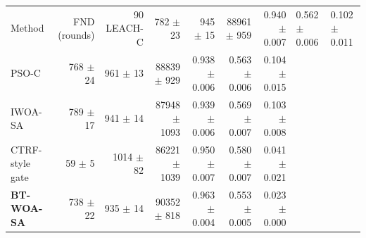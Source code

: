 \begin{tabular}{lrrrrrr}
\toprule
Method & FND (rounds) & 90 %
\midrule
LEACH-C & 782 $\pm$ 23 & 945 $\pm$ 15 & 88961 $\pm$ 959 & 0.940 $\pm$ 0.007 & 0.562 $\pm$ 0.006 & 0.102 $\pm$ 0.011 \\
PSO-C & 768 $\pm$ 24 & 961 $\pm$ 13 & 88839 $\pm$ 929 & 0.938 $\pm$ 0.006 & 0.563 $\pm$ 0.006 & 0.104 $\pm$ 0.015 \\
IWOA-SA & 789 $\pm$ 17 & 941 $\pm$ 14 & 87948 $\pm$ 1093 & 0.939 $\pm$ 0.006 & 0.569 $\pm$ 0.007 & 0.103 $\pm$ 0.008 \\
CTRF-style gate & 59 $\pm$ 5 & 1014 $\pm$ 82 & 86221 $\pm$ 1039 & 0.950 $\pm$ 0.007 & 0.580 $\pm$ 0.007 & 0.041 $\pm$ 0.021 \\
\textbf{BT-WOA-SA} & 738 $\pm$ 22 & 935 $\pm$ 14 & 90352 $\pm$ 818 & 0.963 $\pm$ 0.004 & 0.553 $\pm$ 0.005 & 0.023 $\pm$ 0.000 \\
\bottomrule
\end{tabular}
